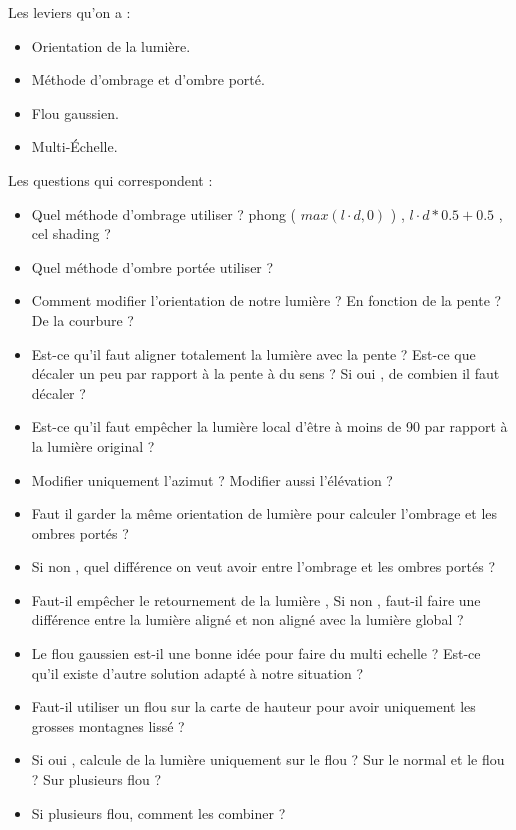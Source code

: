 \documentclass[a4paper]{article}
\begin{document}
Les leviers qu'on a : 

\begin{itemize}
\item Orientation de la lumière.
\item Méthode d'ombrage et d'ombre porté.
\item Flou gaussien.
\item Multi-Échelle. 
\end{itemize}

Les questions qui correspondent :

\begin{itemize}
\item Quel méthode d'ombrage utiliser ? phong ( $max(l\cdot d, 0)$ ) , $ l\cdot d*0.5 + 0.5$ , cel shading ?
\item Quel méthode d'ombre portée utiliser ? 
\item Comment modifier l'orientation de notre lumière ? En fonction de la pente ? De la courbure ?
\item Est-ce qu'il faut aligner totalement la lumière avec la pente ? Est-ce que décaler un peu par rapport à la pente à du sens ? Si oui , de combien il faut décaler ? 
  
\item Est-ce qu'il faut empêcher la lumière local d'être à moins de 90 par rapport à la lumière original ? 
\item Modifier uniquement l'azimut ? Modifier aussi l'élévation ? 
\item Faut il garder la même orientation de lumière pour calculer l'ombrage et les ombres portés ?
\item Si non , quel différence on veut avoir entre l'ombrage et les ombres portés ?
\item Faut-il empêcher le retournement de la lumière , Si non , faut-il faire une différence entre la lumière aligné et non aligné avec la lumière global ? 
\item Le flou gaussien est-il une bonne idée pour faire du multi echelle ? Est-ce qu'il existe d'autre solution adapté à notre situation ? 
\item Faut-il utiliser un flou sur la carte de hauteur pour avoir uniquement les grosses montagnes lissé ?
\item Si oui , calcule de la lumière uniquement sur le flou ? Sur le normal et le flou ? Sur plusieurs flou ? 
\item Si plusieurs flou, comment les combiner ? 

\end{itemize} 
\end{document}

